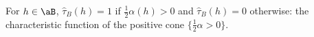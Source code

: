 For $h\in\aB$, $\hat\tau_B(h)=1$ if $\frac12\alpha(h)>0$ and $\hat\tau_B(h)=0$ otherwise: the characteristic function of the positive cone $\{\tfrac12\alpha>0\}$.

